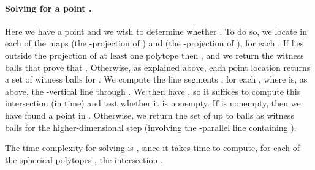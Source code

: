 \documentclass[a4paper,12pt]{article}
\begin{document}
\paragraph{Solving  for a point .}
\label{subsec:Pi_0}
Here we have a point  and we wish to determine
whether . To do so, we locate  in each of the maps
 (the -projection of ) and  (the
-projection of ), for each . If 
lies outside the projection of at least one polytope  then , and we return the witness balls that prove that . Otherwise, as explained above, each point location
returns a set  of  witness balls for . We compute
the  line segments , for each
, where  is, as above, the -vertical
line through . We then have , so it suffices to compute this intersection
(in  time) and test whether it is nonempty. If  is
nonempty, then we have found a point  in . Otherwise, we
return the set  of up
to  balls as witness balls for the higher-dimensional step
(involving the -parallel line containing ).

The time complexity for solving  is , since
it takes  time to compute, for each of the 
spherical polytopes , the intersection .
\end{document}
